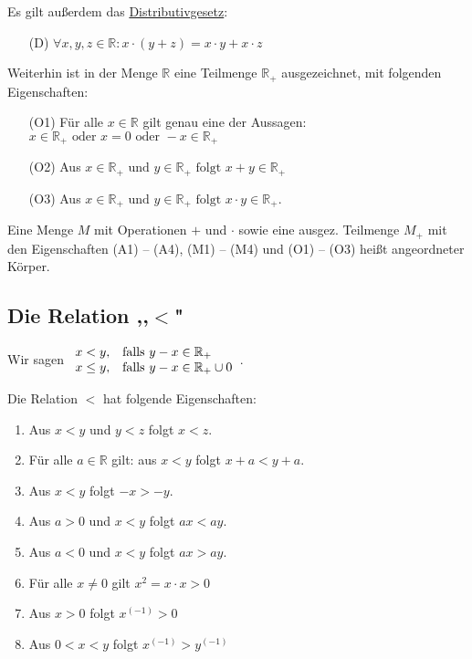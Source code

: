 \documentclass[12pt,a4paper,leqno]{article}
\begin{document}
\begin{description}
\item Es gilt außerdem das \underline{Distributivgesetz}:
\begin{itemize}
\item[(D)] $\forall x, y, z \in \mathbb{R} : x \cdot (y + z) = x \cdot y + x \cdot z$
\end{itemize}

\item Weiterhin ist in der Menge $\mathbb{R}$ eine Teilmenge $\mathbb{R}_+$ ausgezeichnet, mit folgenden Eigenschaften:
\begin{itemize}
\item[(O1)] Für alle $x \in \mathbb{R}$ gilt genau eine der Aussagen: \\ 
$x \in \mathbb{R}_+ \textrm{ oder } x=0  \textrm{ oder } -x \in  \mathbb{R}_+$
\item[(O2)] Aus  $x \in \mathbb{R}_+ \textrm{ und } y \in \mathbb{R}_+ \textrm{ folgt } x + y \in \mathbb{R}_+$
\item[(O3)] Aus $x \in \mathbb{R}_+ \textrm{ und } y \in \mathbb{R}_+ \textrm{ folgt } x \cdot y \in \mathbb{R}_+$.
\end{itemize}

\item[Bem:] Eine Menge $M$ mit Operationen $+$ und $ \cdot $ sowie eine ausgez. Teilmenge $M_+$ mit den Eigenschaften (A1) -- (A4), (M1) -- (M4) und (O1) -- (O3) heißt angeordneter Körper. \\

\subsection*{Die Relation ,,$\mathbf{<}$"}
\item[Def:] Wir sagen	
$\begin{array}{l l}
	x < y,		& \textrm{falls } y - x \in \mathbb{R}_+ \\
	x \leq y, 	& \textrm{falls } y - x \in \mathbb{R}_+ \cup {0}
\end{array}$.

Die Relation $<$ hat folgende Eigenschaften:

\renewcommand{\theenumi}{\roman{enumi}}
\begin{enumerate}
\item Aus $x < y$ und $y < z$ folgt $x < z$.
\item Für alle $a \in \mathbb{R}$ gilt: aus $x < y$ folgt $x + a < y + a$.
\item Aus $x < y$ folgt $-x > -y$.
\item Aus $a > 0$ und $x < y$ folgt $ax < ay$.
\item Aus $a < 0$ und $x < y$ folgt $ax > ay$.
\item Für alle $x \neq 0$ gilt $x^2 = x  \cdot  x > 0$
\item Aus $x > 0$ folgt $x^(-1) > 0$
\item Aus $0 < x < y$ folgt $x^(-1) > y^(-1)$
\end{enumerate}


\end{description}
\end{document}
